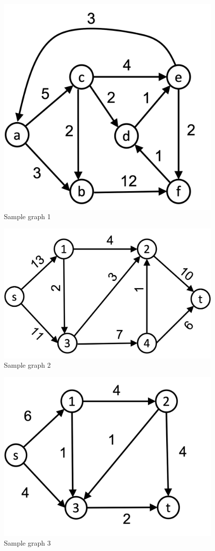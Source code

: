 \documentclass[11  pt]{exam}
\begin{document}
\begin{questions}
		\begin{figure}
			\centering
			\caption{Sample graph 1}
			\includegraphics[width = .5\linewidth]{dijkstrasalg}
		\end{figure}
	
	
			\begin{figure}
				\centering
				\caption{Sample graph 2}
				\includegraphics[width = .5\linewidth]{flow1}
			\end{figure}
		
					\begin{figure}
			\centering
			\caption{Sample graph 3}
			\includegraphics[width = .5\linewidth]{dag1}
		\end{figure}

	\end{questions}
\end{document}

